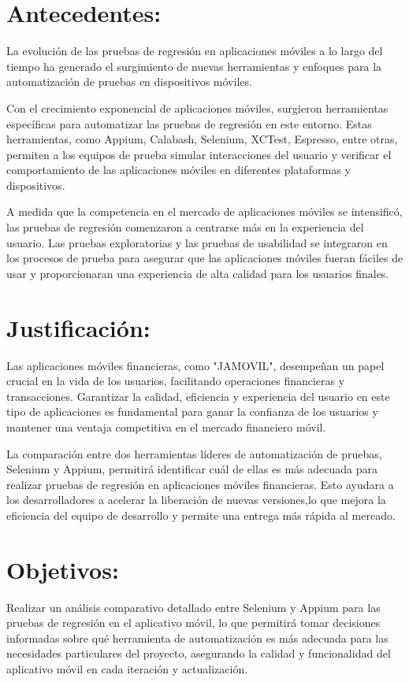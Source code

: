 \documentclass{article}
\begin{document}
\section{Antecedentes:}

La evolución de las pruebas de regresión en aplicaciones móviles a lo largo del tiempo ha generado el surgimiento de nuevas herramientas y enfoques para la automatización de pruebas en dispositivos móviles.

Con el crecimiento exponencial de aplicaciones móviles, surgieron herramientas específicas para automatizar las pruebas de regresión en este entorno. Estas herramientas, como Appium, Calabash, Selenium, XCTest, Espresso, entre otras, permiten a los equipos de prueba simular interacciones del usuario y verificar el comportamiento de las aplicaciones móviles en diferentes plataformas y dispositivos.

A medida que la competencia en el mercado de aplicaciones móviles se intensificó, las pruebas de regresión comenzaron a centrarse más en la experiencia del usuario. Las pruebas exploratorias y las pruebas de usabilidad se integraron en los procesos de prueba para asegurar que las aplicaciones móviles fueran fáciles de usar y proporcionaran una experiencia de alta calidad para los usuarios finales.

       
\section{Justificación:}   

Las aplicaciones móviles financieras, como "JAMOVIL", desempeñan un papel crucial en la vida de los usuarios, facilitando operaciones financieras y transacciones. Garantizar la calidad, eficiencia y experiencia del usuario en este tipo de aplicaciones es fundamental para ganar la confianza de los usuarios y mantener una ventaja competitiva en el mercado financiero móvil.

La comparación entre dos herramientas líderes de automatización de pruebas, Selenium y Appium, permitirá identificar cuál de ellas es más adecuada para realizar pruebas de regresión en aplicaciones móviles financieras. Esto ayudara a los desarrolladores a acelerar la liberación de nuevas versiones,lo que mejora la eficiencia del equipo de desarrollo y permite una entrega más rápida al mercado.

\section{Objetivos:}
Realizar un análisis comparativo detallado entre Selenium y Appium para las pruebas de regresión en el aplicativo móvil, lo que permitirá tomar decisiones informadas sobre qué herramienta de automatización es más adecuada para las necesidades particulares del proyecto, asegurando la calidad y funcionalidad del aplicativo móvil en cada iteración y actualización.
\end{document}
